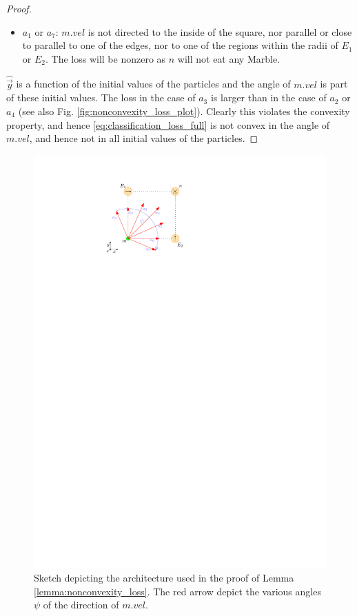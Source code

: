 \begin{proof}
\begin{itemize}
    \item $a_1$ or $a_7$: $m.vel$ is not directed to the inside of the square, nor parallel or close to parallel to one of the edges, nor to one of the regions within the radii of $E_1$ or $E_2$. The loss will be nonzero as $n$ will not eat any Marble.
\end{itemize}
$\hat{\vec{y}}$ is a function of the initial values of the particles and the angle of $m.vel$ is part of these initial values. The loss in the case of $a_3$ is larger than in the case of $a_2$ or $a_4$ (see also Fig. \ref{fig:nonconvexity_loss_plot}). Clearly this violates the convexity property, and hence \eqref{eq:classification_loss_full} is not convex in the angle of $m.vel$, and hence not in all initial values of the particles.
\end{proof}

\begin{figure}[h]
    \centering
    \includegraphics{figures/nonconvexity_of_loss.pdf}
    \caption{Sketch depicting the architecture used in the proof of Lemma \ref{lemma:nonconvexity_loss}. The red arrow depict the various angles $\psi$ of the direction of $m.vel$.}
    \label{fig:nonconvexity_loss}
\end{figure}

